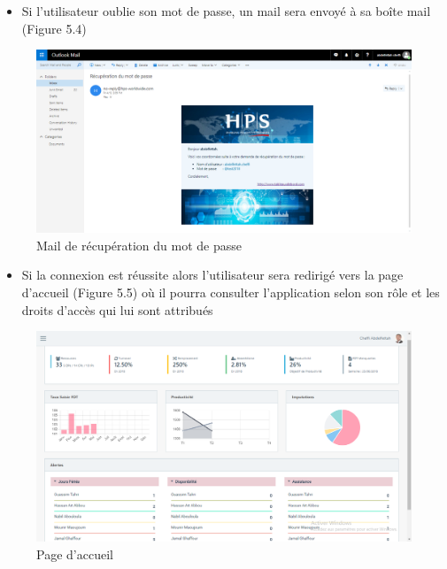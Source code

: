\begin{itemize}[label=\textbullet]
\begin{itemize}
\item Si l’utilisateur oublie son mot de passe, un mail sera envoyé à sa boîte mail (Figure 5.4)
\end{itemize}
\begin{figure}[h!]  
 \centering
    \includegraphics[width=1\textwidth]{chapitre5/Figures/mdpoublie.png}
  \caption{Mail de récupération du mot de passe}
\end{figure}

\begin{itemize}
\item Si la connexion est réussite alors l’utilisateur sera redirigé vers la page d’accueil (Figure 5.5) où il pourra consulter l’application selon son rôle et les droits d’accès qui lui sont attribués 
\end{itemize}
\newpage
\begin{figure}[h!]  
 \centering
    \includegraphics[width=1\textwidth]{chapitre5/Figures/acceuil.png}
  \caption{Page d'accueil}
\end{figure}

\end{itemize}

